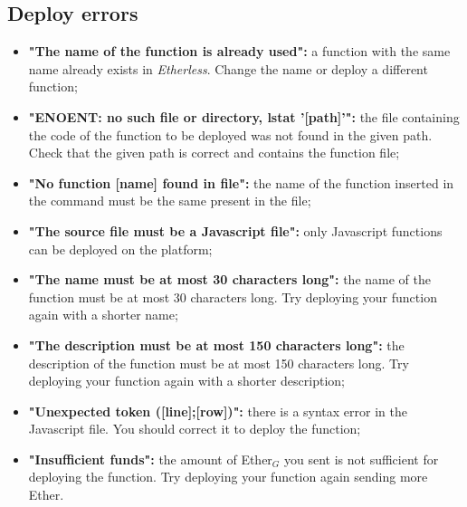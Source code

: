   \subsection{Deploy errors}
  \begin{itemize}
    \item \textbf{"The name of the function is already used":} a function with the same name already exists in \textit{Etherless}. Change the name or deploy a different function;
    \item \textbf{"ENOENT: no such file or directory, lstat '[path]'":} the file containing the code of the function to be deployed was not found in the given path. Check that the given path is correct and contains the function file;
    \item \textbf{"No function [name] found in file":} the name of the function inserted in the command must be the same present in the file;
    \item \textbf{"The source file must be a Javascript file":} only Javascript functions can be deployed on the platform;
    \item \textbf{"The name must be at most 30 characters long":} the name of the function must be at most 30 characters long. Try deploying your function again with a shorter name;
    \item \textbf{"The description must be at most 150 characters long":} the description of the function must be at most 150 characters long. Try deploying your function again with a shorter description;
    \item \textbf{"Unexpected token ([line];[row])":} there is a syntax error in the Javascript file. You should correct it to deploy the function; 
    \item \textbf{"Insufficient funds":} the amount of Ether$_{G}$ you sent is not sufficient for deploying the function. Try deploying your function again sending more Ether.
  \end{itemize}
  
